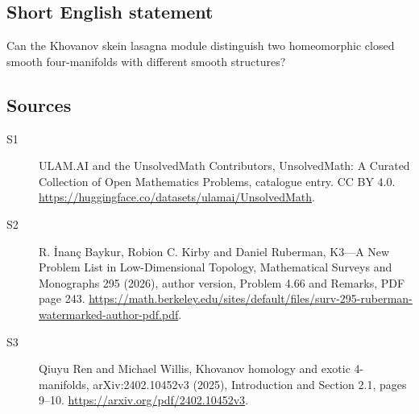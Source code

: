 \documentclass[11pt]{article}
\begin{document}
\subsection{Short English statement}
Can the Khovanov skein lasagna module distinguish two homeomorphic closed smooth four-manifolds with different smooth structures?
\subsection{Sources}
\begin{description}
\item[\hypertarget{source:statement:1}{S1}] ULAM.AI and the UnsolvedMath Contributors, UnsolvedMath: A Curated Collection of Open Mathematics Problems, catalogue entry. CC BY 4.0. \url{https://huggingface.co/datasets/ulamai/UnsolvedMath}.
\item[\hypertarget{source:statement:2}{S2}] R. İnanç Baykur, Robion C. Kirby and Daniel Ruberman, K3—A New Problem List in Low-Dimensional Topology, Mathematical Surveys and Monographs 295 (2026), author version, Problem 4.66 and Remarks, PDF page 243. \url{https://math.berkeley.edu/sites/default/files/surv-295-ruberman-watermarked-author-pdf.pdf}.
\item[\hypertarget{source:statement:3}{S3}] Qiuyu Ren and Michael Willis, Khovanov homology and exotic 4-manifolds, arXiv:2402.10452v3 (2025), Introduction and Section 2.1, pages 9--10. \url{https://arxiv.org/pdf/2402.10452v3}.
\end{description}
\label{end:statement}
\end{document}

